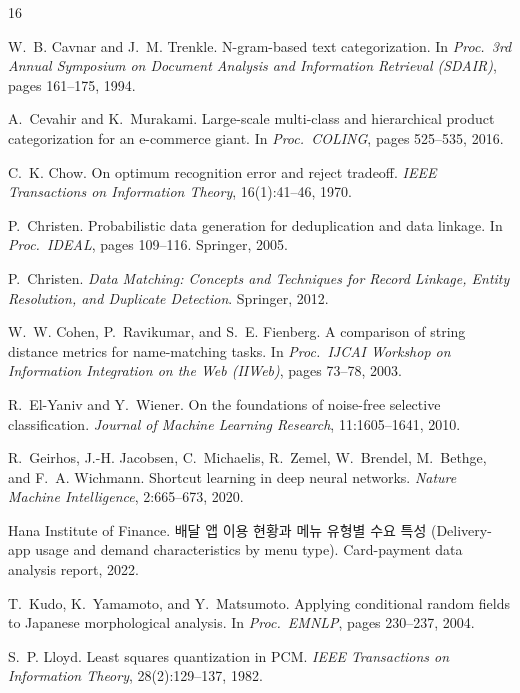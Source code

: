 \documentclass[10pt,twocolumn]{article}
\begin{document}
\begin{thebibliography}{16}\small

W.~B. Cavnar and J.~M. Trenkle.
\newblock N-gram-based text categorization.
\newblock In \emph{Proc.\ 3rd Annual Symposium on Document Analysis and
Information Retrieval (SDAIR)}, pages 161--175, 1994.

A.~Cevahir and K.~Murakami.
\newblock Large-scale multi-class and hierarchical product categorization
for an e-commerce giant.
\newblock In \emph{Proc.\ COLING}, pages 525--535, 2016.

C.~K. Chow.
\newblock On optimum recognition error and reject tradeoff.
\newblock \emph{IEEE Transactions on Information Theory}, 16(1):41--46,
1970.

P.~Christen.
\newblock Probabilistic data generation for deduplication and data linkage.
\newblock In \emph{Proc.\ IDEAL}, pages 109--116. Springer, 2005.

P.~Christen.
\newblock \emph{Data Matching: Concepts and Techniques for Record Linkage,
Entity Resolution, and Duplicate Detection}.
\newblock Springer, 2012.

W.~W. Cohen, P.~Ravikumar, and S.~E. Fienberg.
\newblock A comparison of string distance metrics for name-matching tasks.
\newblock In \emph{Proc.\ IJCAI Workshop on Information Integration on the
Web (IIWeb)}, pages 73--78, 2003.

R.~El-Yaniv and Y.~Wiener.
\newblock On the foundations of noise-free selective classification.
\newblock \emph{Journal of Machine Learning Research}, 11:1605--1641, 2010.

R.~Geirhos, J.-H. Jacobsen, C.~Michaelis, R.~Zemel, W.~Brendel,
M.~Bethge, and F.~A. Wichmann.
\newblock Shortcut learning in deep neural networks.
\newblock \emph{Nature Machine Intelligence}, 2:665--673, 2020.

Hana Institute of Finance.
\newblock 배달 앱 이용 현황과 메뉴 유형별 수요 특성 (Delivery-app usage
and demand characteristics by menu type). Card-payment data analysis
report, 2022.

T.~Kudo, K.~Yamamoto, and Y.~Matsumoto.
\newblock Applying conditional random fields to Japanese morphological
analysis.
\newblock In \emph{Proc.\ EMNLP}, pages 230--237, 2004.

S.~P. Lloyd.
\newblock Least squares quantization in PCM.
\newblock \emph{IEEE Transactions on Information Theory}, 28(2):129--137,
1982.


\end{thebibliography}
\end{document}
